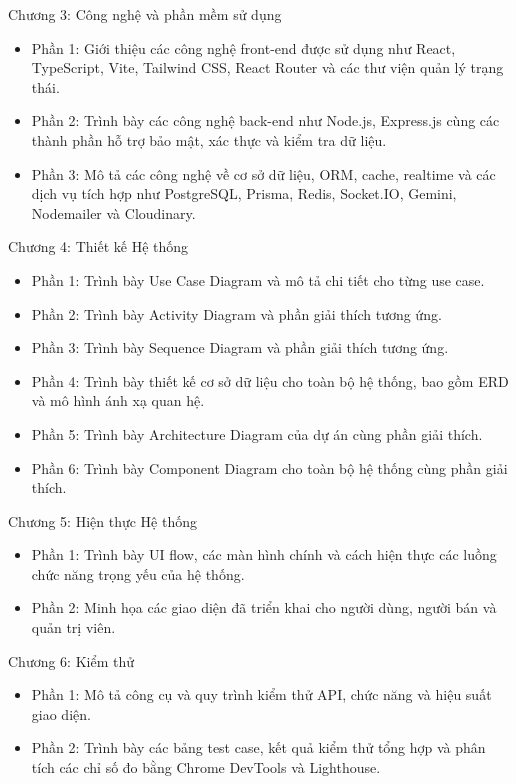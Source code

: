 Chương 3: Công nghệ và phần mềm sử dụng
\begin{itemize}
\item Phần 1: Giới thiệu các công nghệ front-end được sử dụng như React, TypeScript, Vite, Tailwind CSS, React Router và các thư viện quản lý trạng thái.
\item Phần 2: Trình bày các công nghệ back-end như Node.js, Express.js cùng các thành phần hỗ trợ bảo mật, xác thực và kiểm tra dữ liệu.
\item Phần 3: Mô tả các công nghệ về cơ sở dữ liệu, ORM, cache, realtime và các dịch vụ tích hợp như PostgreSQL, Prisma, Redis, Socket.IO, Gemini, Nodemailer và Cloudinary.
\end{itemize}

Chương 4: Thiết kế Hệ thống
\begin{itemize}
\item Phần 1: Trình bày Use Case Diagram và mô tả chi tiết cho từng use case.
\item Phần 2: Trình bày Activity Diagram và phần giải thích tương ứng.
\item Phần 3: Trình bày Sequence Diagram và phần giải thích tương ứng.
\item Phần 4: Trình bày thiết kế cơ sở dữ liệu cho toàn bộ hệ thống, bao gồm ERD và mô hình ánh xạ quan hệ.
\item Phần 5: Trình bày Architecture Diagram của dự án cùng phần giải thích.
\item Phần 6: Trình bày Component Diagram cho toàn bộ hệ thống cùng phần giải thích.

\end{itemize}

Chương 5: Hiện thực Hệ thống
\begin{itemize}
\item Phần 1: Trình bày UI flow, các màn hình chính và cách hiện thực các luồng chức năng trọng yếu của hệ thống.
\item Phần 2: Minh họa các giao diện đã triển khai cho người dùng, người bán và quản trị viên.
\end{itemize}

Chương 6: Kiểm thử
\begin{itemize}
\item Phần 1: Mô tả công cụ và quy trình kiểm thử API, chức năng và hiệu suất giao diện.
\item Phần 2: Trình bày các bảng test case, kết quả kiểm thử tổng hợp và phân tích các chỉ số đo bằng Chrome DevTools và Lighthouse.
\end{itemize}

